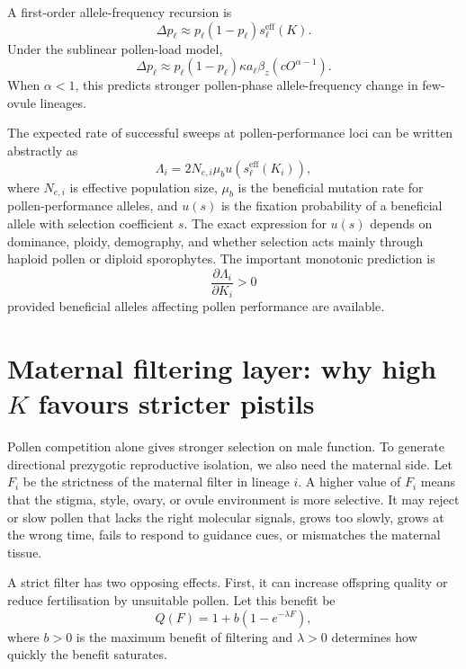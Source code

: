 \documentclass[11pt]{article}
\begin{document}
A first-order allele-frequency recursion is
\begin{equation}
\Delta p_\ell \approx p_\ell(1-p_\ell)s_{\ell}^{\mathrm{eff}}(K).
\label{eq:allele_change}
\end{equation}
Under the sublinear pollen-load model,
\begin{equation}
\Delta p_\ell \approx p_\ell(1-p_\ell)\kappa a_\ell \beta_z\left(cO^{\alpha-1}\right).
\end{equation}
When \(\alpha<1\), this predicts stronger pollen-phase allele-frequency change in few-ovule lineages.

The expected rate of successful sweeps at pollen-performance loci can be written abstractly as
\begin{equation}
\Lambda_i = 2N_{e,i}\mu_b u\left(s_{\ell}^{\mathrm{eff}}(K_i)\right),
\label{eq:sweep_rate}
\end{equation}
where \(N_{e,i}\) is effective population size, \(\mu_b\) is the beneficial mutation rate for pollen-performance alleles, and \(u(s)\) is the fixation probability of a beneficial allele with selection coefficient \(s\). The exact expression for \(u(s)\) depends on dominance, ploidy, demography, and whether selection acts mainly through haploid pollen or diploid sporophytes. The important monotonic prediction is
\begin{equation}
\frac{\partial \Lambda_i}{\partial K_i} > 0
\end{equation}
provided beneficial alleles affecting pollen performance are available.

\section{Maternal filtering layer: why high \texorpdfstring{\(K\)}{K} favours stricter pistils}

Pollen competition alone gives stronger selection on male function. To generate directional prezygotic reproductive isolation, we also need the maternal side. Let \(F_i\) be the strictness of the maternal filter in lineage \(i\). A higher value of \(F_i\) means that the stigma, style, ovary, or ovule environment is more selective. It may reject or slow pollen that lacks the right molecular signals, grows too slowly, grows at the wrong time, fails to respond to guidance cues, or mismatches the maternal tissue.

A strict filter has two opposing effects. First, it can increase offspring quality or reduce fertilisation by unsuitable pollen. Let this benefit be
\begin{equation}
Q(F)=1+b(1-e^{-\lambda F}),
\end{equation}
where \(b>0\) is the maximum benefit of filtering and \(\lambda>0\) determines how quickly the benefit saturates.
\end{document}
